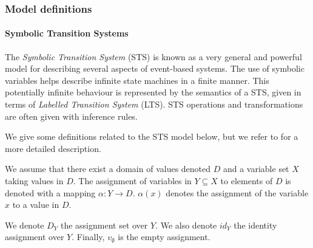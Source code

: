\subsubsection{Model definitions}

\paragraph{Symbolic Transition Systems}
\label{sec:definitions:sts}

The \textit{Symbolic Transition System} (STS) is known as a very
general and powerful model for describing several aspects of
event-based systems. The use of symbolic variables
helps describe infinite state machines in a finite manner. This
potentially infinite behaviour is represented by the semantics of
a STS, given in terms of \textit{Labelled Transition System}
(LTS). STS operations and transformations are often given with
inference rules.

We give some definitions related to the STS model below, but we
refer to \cite{FTW05} for a more detailed description.

\begin{definition}
We assume that there exist a domain of values denoted $D$ and a
variable set $X$ taking values in $D$. The assignment of
variables in $Y \subseteq X$ to elements of $D$ is denoted with a
mapping $\alpha: Y \rightarrow D$. $\alpha(x)$ denotes the
assignment of the variable $x$ to a value in $D$.

We denote $D_Y$ the assignment set over $Y$. We also denote
$id_Y$ the identity assignment over $Y$. Finally, $v_\emptyset$
is the empty assignment.
\end{definition}

